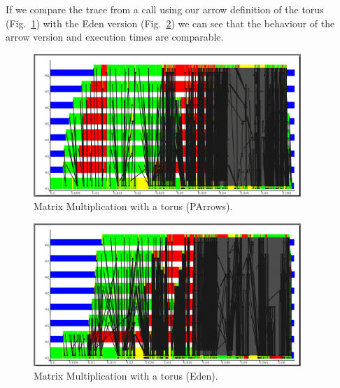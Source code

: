 If we compare the trace from a call using our arrow definition of the torus (Fig.~\ref{fig:torus_parrows_trace}) with the Eden version (Fig.~\ref{fig:torus_eden_trace}) we can see that the behaviour of the arrow version and execution times are comparable.
\begin{figure}[ht]
	\centering
	\includegraphics[width=0.9\textwidth]{images/torus_matrix_parrows_scale}
	\caption[Matrix Multiplication with a torus (Parrows)]{Matrix Multiplication with a torus (PArrows).}
	\label{fig:torus_parrows_trace}
\end{figure}

\begin{figure}[ht]
	\centering
	\includegraphics[width=0.9\textwidth]{images/torus_matrix_eden_scale}
	\caption[Matrix Multiplication with a torus (Eden)]{Matrix Multiplication with a torus (Eden).}
	\label{fig:torus_eden_trace}
\end{figure}


